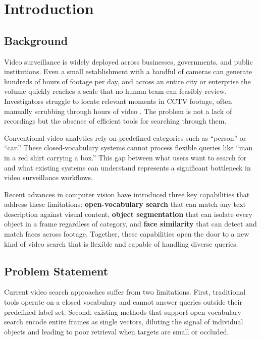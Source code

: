 \chapter{Introduction}
\label{chap:introduction}

\section{Background}
\label{section:background}

Video surveillance is widely deployed across businesses, governments, and public institutions. Even a small establishment with a handful of cameras can generate hundreds of hours of footage per day, and across an entire city or enterprise the volume quickly reaches a scale that no human team can feasibly review. Investigators struggle to locate relevant moments in CCTV footage, often manually scrubbing through hours of video \cite{ashby2017value}. The problem is not a lack of recordings but the absence of efficient tools for searching through them.

Conventional video analytics rely on predefined categories such as ``person'' or ``car.'' These closed-vocabulary systems cannot process flexible queries like ``man in a red shirt carrying a box.'' This gap between what users want to search for and what existing systems can understand represents a significant bottleneck in video surveillance workflows.

Recent advances in computer vision have introduced three key capabilities that address these limitations: \textbf{open-vocabulary search} that can match any text description against visual content, \textbf{object segmentation} that can isolate every object in a frame regardless of category, and \textbf{face similarity} that can detect and match faces across footage. Together, these capabilities open the door to a new kind of video search that is flexible and capable of handling diverse queries.

\section{Problem Statement}
\label{section:problem-statement}

Current video search approaches suffer from two limitations. First, traditional tools operate on a closed vocabulary and cannot answer queries outside their predefined label set. Second, existing methods that support open-vocabulary search encode entire frames as single vectors, diluting the signal of individual objects and leading to poor retrieval when targets are small or occluded.

